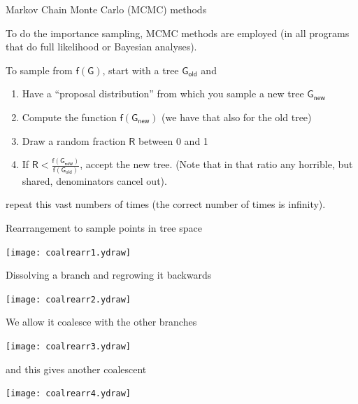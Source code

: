 \documentclass[bluish,slideColor,colorBG,pdf]{prosper}
\begin{document}
\begin{slide}[Replace]{Markov Chain Monte Carlo (MCMC) methods}

To do the importance sampling, MCMC methods are employed (in all programs that
do full likelihood or Bayesian analyses).
\medskip

To sample from $\mathsf{f(G)}$, start with a tree $\mathsf{G_{old}}$ and

\begin{enumerate}
\item Have a ``proposal distribution'' from which you sample a new tree
$\mathsf{G_{new}}$
\item Compute the function $\mathsf{f(G_{new})}$ (we have that also for the
old tree)
\item Draw a random fraction $\mathsf{R}$ between 0 and 1
\item If $\mathsf{R < \frac{f(G_{new})}{f(G_{old})}}$, accept the new tree.
(Note that in that ratio any horrible, but shared, denominators cancel out).
\end{enumerate}
repeat this vast numbers of times (the correct number of times is infinity).

\end{slide}

\begin{slide}[Replace]{Rearrangement to sample points in tree space}

\centerline{\texttt{[image: coalrearr1.ydraw]}}

\end{slide}

\begin{slide}[Replace]{Dissolving a branch and regrowing it backwards}

\centerline{\texttt{[image: coalrearr2.ydraw]}}

\end{slide}

\begin{slide}[Replace]{We allow it coalesce with the other branches}

\centerline{\texttt{[image: coalrearr3.ydraw]}}

\end{slide}

\begin{slide}[Replace]{and this gives another coalescent}

\centerline{\texttt{[image: coalrearr4.ydraw]}}

\end{slide}
\end{document}
